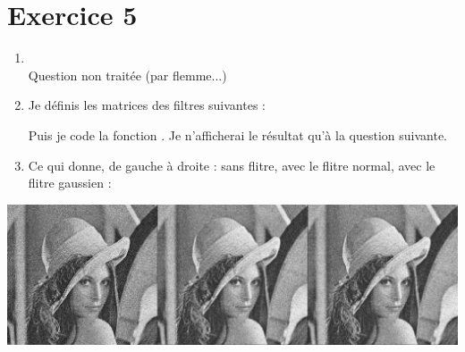 \section{Exercice 5}
\begin{enumerate}
  \item
        \\
        Question non traitée (par flemme...)

  \item

        \bigskip

        Je définis les matrices des filtres suivantes :

        \bigskip


        Puis je code la fonction . Je n'afficherai le résultat qu'à la
        question suivante.
        \newpage


  \item

        Ce qui donne, de gauche à droite : sans flitre, avec le flitre normal,
        avec le flitre gaussien :
\end{enumerate}

\begin{center}
  \includegraphics[scale=0.33]{section-02/q3-2.png}
\end{center}
